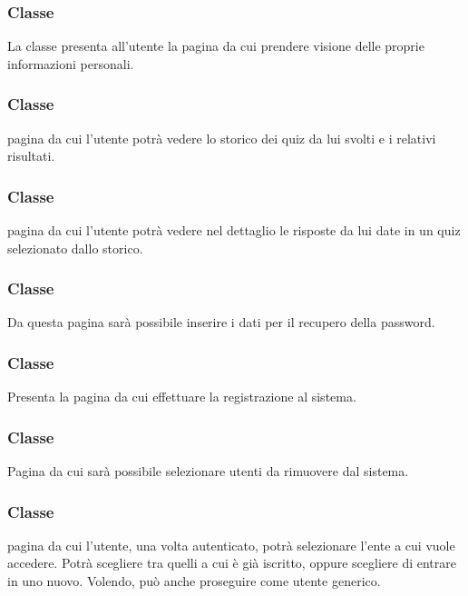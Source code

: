 \subsubsection{Classe }
La classe presenta all'utente la pagina da cui prendere visione delle proprie informazioni personali.
\begin{itemize}
\end{itemize}
\subsubsection{Classe }
pagina da cui l'utente potrà vedere lo storico dei quiz da lui svolti e i relativi risultati.
\begin{itemize}
\end{itemize}
\subsubsection{Classe }
pagina da cui l'utente potrà vedere nel dettaglio le risposte da lui date in un quiz selezionato dallo storico.
\begin{itemize}
\end{itemize}
\subsubsection{Classe }
Da questa pagina sarà possibile inserire i dati per il recupero della password.
\begin{itemize}
\end{itemize}
\subsubsection{Classe }
Presenta la pagina da cui effettuare la  registrazione al sistema.
\begin{itemize}
\end{itemize}
\subsubsection{Classe }
Pagina da cui sarà possibile selezionare utenti da rimuovere dal sistema.
\begin{itemize}
\end{itemize}
\subsubsection{Classe }
pagina da cui l'utente, una volta autenticato, potrà selezionare l'ente a cui vuole accedere. Potrà scegliere tra quelli a cui è già iscritto, oppure scegliere di entrare in uno nuovo. Volendo, può anche proseguire come utente generico.
\begin{itemize}
\end{itemize}
